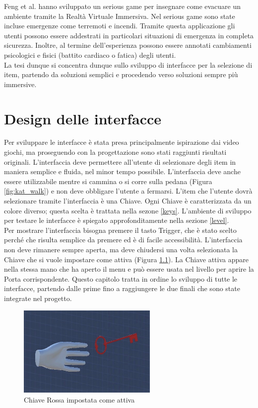 \documentclass[target=bach,aauheader=]{thud}
\begin{document}
Feng et al. \cite{Feng} hanno sviluppato un serious game per insegnare come evacuare un ambiente tramite la Realtà Virtuale Immersiva.
Nel serious game sono state incluse emergenze come terremoti e incendi. 
Tramite questa applicazione gli utenti possono essere addestrati in particolari situazioni di emergenza in completa sicurezza.
Inoltre, al termine dell'esperienza possono essere annotati cambiamenti psicologici e fisici (battito cardiaco o fatica) degli utenti. \\

La tesi dunque si concentra dunque sullo sviluppo di interfacce per la selezione di item, partendo da soluzioni semplici e procedendo verso soluzioni sempre più immersive. 

\chapter{Design delle interfacce} %
\label{design}

Per sviluppare le interfacce è stata presa principalmente ispirazione dai video giochi, ma proseguendo con la progettazione sono stati raggiunti risultati originali. 
L'interfaccia deve permettere all'utente di selezionare degli item in maniera semplice e fluida, nel minor tempo possibile.
L'interfaccia deve anche essere utilizzabile mentre si cammina o si corre sulla pedana (Figura \ref{fig:kat_walk}) e non deve obbligare l'utente a fermarsi.
L'item che l'utente dovrà selezionare tramite l'interfaccia è una Chiave.
Ogni Chiave è caratterizzata da un colore diverso; questa scelta è trattata nella sezone \ref{keys}.
L'ambiente di sviluppo per testare le interfacce è spiegato approfonditamente nella sezione \ref{level}. \\

Per mostrare l'interfaccia bisogna premere il tasto Trigger, che è stato scelto perché che risulta semplice da premere ed è di facile accessibilità.  
L'interfaccia non deve rimanere sempre aperta, ma deve chiudersi una volta selezionata la Chiave che si vuole impostare come attiva (Figura \ref{fig:key_red}).
La Chiave attiva appare nella stessa mano che ha aperto il menu e può essere usata nel livello per aprire la Porta corrispondente.
Questo capitolo tratta in ordine lo sviluppo di tutte le interfacce, partendo dalle prime fino a raggiungere le due finali che sono state integrate nel progetto.

\begin{figure}[h]
    \centering
    \includegraphics[width=0.60\textwidth]{key_red}
    \caption{Chiave Rossa impostata come attiva}
    \label{fig:key_red}
\end{figure}
\end{document}
